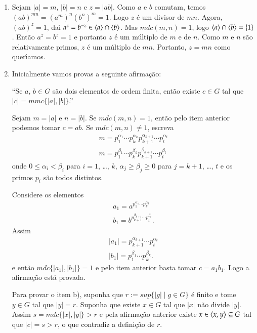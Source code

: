 \begin{prova}
	\begin{enumerate}[label=({\roman*})]
		\item Sejam $|a| = m$, $|b| = n$ e $z = |ab|$. Como $a$ e $b$ comutam, temos $(ab)^{mn} = (a^m)^n(b^n)^m = 1$. Logo $z$ \'e um divisor de $mn$. Agora, $(ab)^z = 1$, da{\'\i} $a^z = b^{-z} \in \langle{a}\rangle\cap\langle{b}\rangle$. Mas $mdc(m,n) = 1$, logo $\langle{a}\rangle\cap\langle{b}\rangle = \{1\}$. Ent\~ao $a^z = b^z = 1$ e portanto $z$ \'e um m\'ultiplo de $m$ e de $n$. Como $m$ e $n$ s\~ao relativamente primos, $z$ \'e um m\'ultiplo de $mn$. Portanto, $z = mn$ como quer{\'\i}amos.
		\item Inicialmente vamos provas a seguinte afirma\c{c}\~ao:

		``Se $a$, $b \in G$ s\~ao dois elementos de ordem finita, ent\~ao existe $c \in G$ tal que $|c| = mmc\{|a|, |b|\}$.''

		Sejam $m = |a|$ e $n = |b|$. Se $mdc(m, n) = 1$, ent\~ao pelo item anterior podemos tomar $c = ab$. Se $mdc(m, n) \ne 1$, escreva
		\begin{align*}
			m = p_1^{\alpha_1}\cdots p_k^{\alpha_k}p_{k + 1}^{\alpha_{k + 1}}\cdots p_t^{\alpha_t}\\
			m = p_1^{\beta_1}\cdots p_k^{\beta_k}p_{k + 1}^{\beta_{k + 1}}\cdots p_t^{\beta_t}
		\end{align*}
		onde $0 \le \alpha_i < \beta_i$ para $i = 1$, \dots, $k$, $\alpha_j \ge \beta_j \ge 0$ para $j = k + 1$, \dots, $t$ e os primos $p_i$ s\~ao todos distintos.

		Considere os elementos
		\begin{align*}
			a_1 = a^{p_1^{\alpha_1}\cdots p_k^{\alpha_k}}\\
			b_1 = b^{p_{k + 1}^{\beta_{k + 1}}\cdots p_t^{\beta_t}}.
		\end{align*}
		Assim
		\begin{align*}
			|a_1| = p_{k + 1}^{\alpha_{k + 1}}\cdots p_t^{\alpha_t}\\
			|b_1| = p_1^{\beta_1}\cdots p_k^{\beta_k}.
		\end{align*}
		e ent\~ao $mdc\{|a_1|, |b_1|\} = 1$  e pelo item anterior basta tomar $c = a_1b_1$. Logo a afirma\c{c}\~ao est\'a provada.

		Para provar o item b), suponha que $r := sup\{|g| \mid g \in G\}$ \'e finito e tome $y \in G$ tal que $|y| = r$. Suponha que existe $x \in G$ tal que $|x|$ n\~ao divide $|y|$. Assim $s = mdc\{|x|, |y|\} > r$ e pela afirma\c{c}\~ao anterior existe $x \in \langle{x, y}\rangle \subseteq G$ tal que $|c| = s > r$, o que contradiz a defini\c{c}\~ao de $r$.
	\end{enumerate}
\end{prova}

